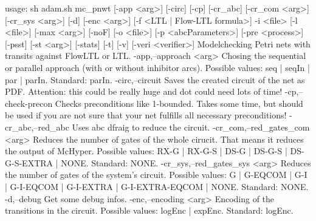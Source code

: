usage: sh adam.sh mc_pnwt [-app <arg>] [-circ] [-cp] [-cr_abc] [-cr_com
       <arg>] [-cr_sys <arg>] [-d] [-enc <arg>] [-f <LTL | Flow-LTL
       formula>] -i <file> [-l <file>] [-max <arg>] [-noF] [-o <file>] [-p
       <abcParameters>] [-pre <process>] [-psst] [-st <arg>] [-stats] [-t]
       [-v] [-veri <verifier>]
Modelchecking Petri nets with transits against FlowLTL  or LTL.
 -app,--approach <arg>                   Chosing the sequential or
                                         parallel approach (with or
                                         without inhibitor arcs). Possible
                                         values: seq | seqIn | par |
                                         parIn. Standard: parIn.
 -circ,--circuit                         Saves the created circuit of the
                                         net as PDF. Attention: this could
                                         be really huge and dot could need
                                         lots of time!
 -cp,--check-precon                      Checks preconditions like
                                         1-bounded. Takes some time, but
                                         should be used if you are not
                                         sure that your net fulfills  all
                                         necessary preconditions!
 -cr_abc,--red_abc                       Uses abc dfraig to reduce the
                                         circuit.
 -cr_com,--red_gates_com <arg>           Reduces the number of gates of
                                         the whole cirucit. That means it
                                         reduces the output of McHyper.
                                         Possible values: RX-G | RX-G-S |
                                         DS-G | DS-G-S | DS-G-S-EXTRA |
                                         NONE. Standard: NONE.
 -cr_sys,--red_gates_sys <arg>           Reduces the number of gates of
                                         the system's circuit. Possible
                                         values: G | G-EQCOM | G-I |
                                         G-I-EQCOM | G-I-EXTRA |
                                         G-I-EXTRA-EQCOM | NONE. Standard:
                                         NONE.
 -d,--debug                              Get some debug infos.
 -enc,--encoding <arg>                   Encoding of the transitions in
                                         the circuit. Possible values:
                                         logEnc | expEnc. Standard:
                                         logEnc.
